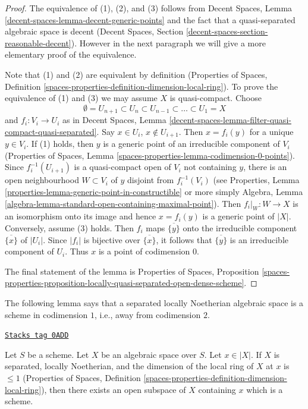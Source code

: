 \begin{proof}
The equivalence of (1), (2), and (3) follows from
Decent Spaces, Lemma \ref{decent-spaces-lemma-decent-generic-points}
and the fact that a quasi-separated algebraic space is decent
(Decent Spaces, Section \ref{decent-spaces-section-reasonable-decent}).
However in the next paragraph we will give a more elementary proof of the
equivalence.

\medskip\noindent
Note that (1) and (2) are equivalent by definition
(Properties of Spaces, Definition
\ref{spaces-properties-definition-dimension-local-ring}).
To prove the equivalence of (1) and (3) we may assume $X$ is quasi-compact.
Choose
$$
\emptyset = U_{n + 1} \subset
U_n \subset U_{n - 1} \subset \ldots \subset U_1 = X
$$
and $f_i : V_i \to U_i$ as in Decent Spaces, Lemma
\ref{decent-spaces-lemma-filter-quasi-compact-quasi-separated}.
Say $x \in U_i$, $x \not \in U_{i + 1}$. Then $x = f_i(y)$ for
a unique $y \in V_i$. If (1) holds, then $y$ is a generic point of
an irreducible component of $V_i$ (Properties of Spaces, Lemma
\ref{spaces-properties-lemma-codimension-0-points}).
Since $f_i^{-1}(U_{i + 1})$ is a quasi-compact open of $V_i$
not containing $y$, there is an open neighbourhood $W \subset V_i$
of $y$ disjoint from $f_i^{-1}(V_i)$
(see
Properties, Lemma \ref{properties-lemma-generic-point-in-constructible}
or more simply Algebra, Lemma
\ref{algebra-lemma-standard-open-containing-maximal-point}).
Then $f_i|_W : W \to X$ is an isomorphism onto its image and hence
$x = f_i(y)$ is a generic point of $|X|$. Conversely, assume (3) holds.
Then $f_i$ maps $\overline{\{y\}}$ onto the irreducible component
$\overline{\{x\}}$ of $|U_i|$. Since $|f_i|$ is bijective over
$\overline{\{x\}}$, it follows that $\overline{\{y\}}$
is an irreducible component of $U_i$. Thus $x$ is a point of
codimension $0$.

\medskip\noindent
The final statement of the lemma is
Properties of Spaces, Proposition
\ref{spaces-properties-proposition-locally-quasi-separated-open-dense-scheme}.
\end{proof}

The following lemma says that a separated locally Noetherian algebraic
space is a scheme in codimension $1$, i.e., away from codimension $2$.

\begin{lemma}
\label{spaces-over-fields-lemma-codim-1-point-in-schematic-locus}
\href{https://stacks.math.columbia.edu/tag/0ADD}{\texttt{Stacks tag 0ADD}}


Let $S$ be a scheme. Let $X$ be an algebraic space over $S$.
Let $x \in |X|$. If $X$ is separated, locally Noetherian, and
the dimension of the local ring of $X$ at $x$ is $\leq 1$
(Properties of Spaces, Definition
\ref{spaces-properties-definition-dimension-local-ring}),
then there exists an open subspace of $X$ containing $x$ which is a scheme.
\end{lemma}

